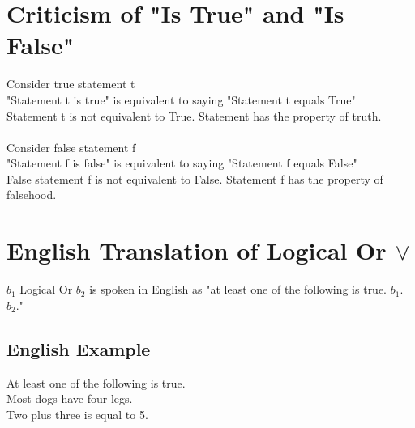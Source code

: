 \documentclass[11pt]{article}
\begin{document}
\section{Criticism of "Is True" and "Is False"}
Consider true statement t\\
"Statement t is true" is equivalent to saying "Statement t equals True"\\
Statement t is not equivalent to True. Statement has the property of truth.\\
\\
Consider false statement f\\
"Statement f is false" is equivalent to saying "Statement f equals False"\\
False statement f is not equivalent to False. Statement f has the property of falsehood.\\




\section{English Translation of Logical Or $\lor$}
$b_1$ Logical Or $b_2$ is spoken in English as "at least one of the following is true. $b_1$. $b_2.$"
\subsection{English Example}
At least one of the following is true.\\
Most dogs have four legs.\\
Two plus three is equal to 5.
\end{document}
